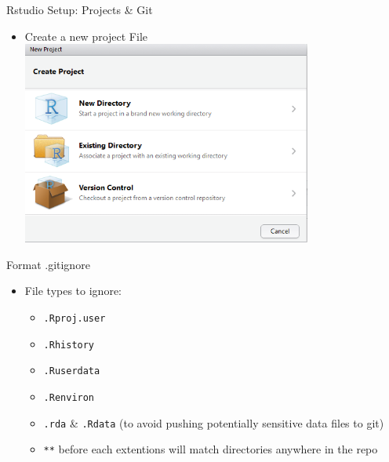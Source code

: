 \documentclass[
  ignorenonframetext,
]{beamer}
\providecommand{\tightlist}{%
  \setlength{\itemsep}{0pt}\setlength{\parskip}{0pt}}
\begin{document}
\begin{frame}{Rstudio Setup: Projects \& Git}
\protect\hypertarget{rstudio-setup-projects-git-1}{}

\begin{itemize}
\tightlist
\item
  Create a new project File
  \includegraphics[width=0.75\textwidth,height=\textheight]{../external/images/setup_2_rstudio_project.PNG}
\end{itemize}

\end{frame}

\begin{frame}[fragile]{Format .gitignore}
\protect\hypertarget{format-.gitignore}{}

\begin{itemize}
\tightlist
\item
  File types to ignore:

  \begin{itemize}
  \tightlist
  \item
    \texttt{.Rproj.user}
  \item
    \texttt{.Rhistory}
  \item
    \texttt{.Ruserdata}
  \item
    \texttt{.Renviron}
  \item
    \texttt{.rda} \& \texttt{.Rdata} (to avoid pushing potentially
    sensitive data files to git)
  \item
    \texttt{**} before each extentions will match directories anywhere
    in the repo
  \end{itemize}
\end{itemize}

\end{frame}
\end{document}
